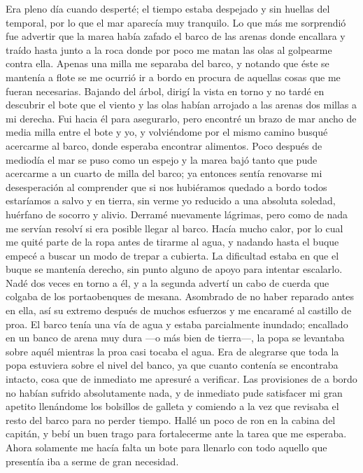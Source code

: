 \documentclass{novela}
\begin{document}
    Era pleno día cuando desperté; el tiempo estaba despejado y sin huellas del temporal, por lo que el mar aparecía muy tranquilo. Lo que más me sorprendió fue advertir que la marea había zafado el barco de las arenas donde encallara y traído hasta junto a la roca donde por poco me matan las olas al golpearme contra ella. Apenas una milla me separaba del barco, y notando que éste se mantenía a flote se me ocurrió ir a bordo en procura de aquellas cosas que me fueran necesarias.
    Bajando del árbol, dirigí la vista en torno y no tardé en descubrir el bote que el viento y las olas habían arrojado a las arenas dos millas a mi derecha. Fui hacia él para asegurarlo, pero encontré un brazo de mar ancho de media milla entre el bote y yo, y volviéndome por el mismo camino busqué acercarme al barco, donde esperaba encontrar alimentos.
    Poco después de mediodía el mar se puso como un espejo y la marea bajó tanto que pude acercarme a un cuarto de milla del barco; ya entonces sentía renovarse mi desesperación al comprender que si nos hubiéramos quedado a bordo todos estaríamos a salvo y en tierra, sin verme yo reducido a una absoluta soledad, huérfano de socorro y alivio. Derramé nuevamente lágrimas, pero como de nada me servían resolví si era posible llegar al barco. Hacía mucho calor, por lo cual me quité parte de la ropa antes de tirarme al agua, y nadando hasta el buque empecé a buscar un modo de trepar a cubierta. La dificultad estaba en que el buque se mantenía derecho, sin punto alguno de apoyo para intentar escalarlo. Nadé dos veces en torno a él, y a la segunda advertí un cabo de cuerda que colgaba de los portaobenques de mesana. Asombrado de no haber reparado antes en ella, así su extremo después de muchos esfuerzos y me encaramé al castillo de proa. El barco tenía una vía de agua y estaba parcialmente inundado; encallado en un banco de arena muy dura —o más bien de tierra—, la popa se levantaba sobre aquél mientras la proa casi tocaba el agua. Era de alegrarse que toda la popa estuviera sobre el nivel del banco, ya que cuanto contenía se encontraba intacto, cosa que de inmediato me apresuré a verificar. Las provisiones de a bordo no habían sufrido absolutamente nada, y de inmediato pude satisfacer mi gran apetito llenándome los bolsillos de galleta y comiendo a la vez que revisaba el resto del barco para no perder tiempo. Hallé un poco de ron en la cabina del capitán, y bebí un buen trago para fortalecerme ante la tarea que me esperaba. Ahora solamente me hacía falta un bote para llenarlo con todo aquello que presentía iba a serme de gran necesidad.
\end{document}
